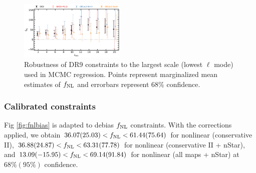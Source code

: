\begin{figure}
    \centering
    \includegraphics[width=0.45\textwidth]{figures/fnl_elmin.pdf}     
    \caption{Robustness of DR9 constraints to the largest scale (lowest $\ell$ mode) used in MCMC regression. Points represent marginalized mean estimates of $f_{\rm NL}$ and errorbars represent $68$\% confidence.}\label{fig:mcmc_dr9elmin}
\end{figure}

\subsubsection{Calibrated constraints}
Fig \ref{fig:fnlbias} is adapted to debias $f_{\rm NL}$ constraints. With the corrections applied, we obtain $36.07 (25.03) < f_{\rm NL} < 61.44(75.64)$ for nonlinear (conservative II), $36.88(24.87) < f_{\rm NL} < 63.31(77.78)$ for nonlinear (conservative II + nStar), and $13.09(-15.95) < f_{\rm NL} < 69.14(91.84)$ for nonlinear (all maps + nStar) at $68\% (95\%)$ confidence. 